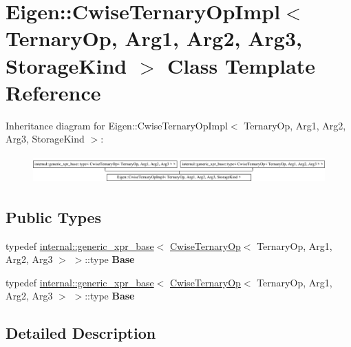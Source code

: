 \hypertarget{class_eigen_1_1_cwise_ternary_op_impl}{}\section{Eigen\+:\+:Cwise\+Ternary\+Op\+Impl$<$ Ternary\+Op, Arg1, Arg2, Arg3, Storage\+Kind $>$ Class Template Reference}
\label{class_eigen_1_1_cwise_ternary_op_impl}
Inheritance diagram for Eigen\+:\+:Cwise\+Ternary\+Op\+Impl$<$ Ternary\+Op, Arg1, Arg2, Arg3, Storage\+Kind $>$\+:\begin{figure}[H]
\begin{center}
\leavevmode
\includegraphics[height=1.083172cm]{class_eigen_1_1_cwise_ternary_op_impl}
\end{center}
\end{figure}
\subsection*{Public Types}
\begin{DoxyCompactItemize}
\item 
\mbox{\label{class_eigen_1_1_cwise_ternary_op_impl_aaef7bd0ab2afd8a60599b23a9f6dab63}} 
typedef \hyperlink{struct_eigen_1_1internal_1_1generic__xpr__base}{internal\+::generic\+\_\+xpr\+\_\+base}$<$ \hyperlink{group___core___module_class_eigen_1_1_cwise_ternary_op}{Cwise\+Ternary\+Op}$<$ Ternary\+Op, Arg1, Arg2, Arg3 $>$ $>$\+::type {\bfseries Base}
\item 
\mbox{\label{class_eigen_1_1_cwise_ternary_op_impl_aaef7bd0ab2afd8a60599b23a9f6dab63}} 
typedef \hyperlink{struct_eigen_1_1internal_1_1generic__xpr__base}{internal\+::generic\+\_\+xpr\+\_\+base}$<$ \hyperlink{group___core___module_class_eigen_1_1_cwise_ternary_op}{Cwise\+Ternary\+Op}$<$ Ternary\+Op, Arg1, Arg2, Arg3 $>$ $>$\+::type {\bfseries Base}
\end{DoxyCompactItemize}


\subsection{Detailed Description}
